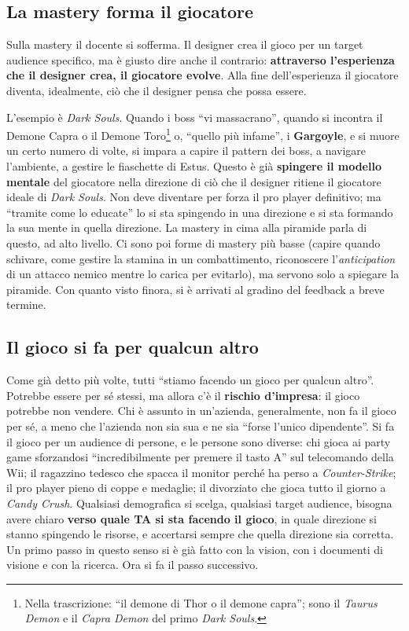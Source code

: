 \subsection{La mastery forma il giocatore}

Sulla mastery il docente si sofferma. Il designer crea il gioco per un target
audience specifico, ma è giusto dire anche il contrario: \textbf{attraverso
l'esperienza che il designer crea, il giocatore evolve}. Alla fine dell'esperienza
il giocatore diventa, idealmente, ciò che il designer pensa che possa essere.

L'esempio è \emph{Dark Souls}. Quando i boss ``vi massacrano'', quando si incontra
il Demone Capra o il Demone Toro\footnote{Nella trascrizione: ``il demone di Thor o il
demone capra''; sono il \emph{Taurus Demon} e il \emph{Capra Demon} del primo
\emph{Dark Souls}.} o, ``quello più infame'', i \textbf{Gargoyle}, e si muore un
certo numero di volte, si impara a capire il pattern dei boss, a navigare
l'ambiente, a gestire le fiaschette di Estus. Questo è già \textbf{spingere il
modello mentale} del giocatore nella direzione di ciò che il designer ritiene il
giocatore ideale di \emph{Dark Souls}. Non deve diventare per forza il pro player
definitivo; ma ``tramite come lo educate'' lo si sta spingendo in una direzione e si
sta formando la sua mente in quella direzione. La mastery in cima alla piramide
parla di questo, ad alto livello. Ci sono poi forme di mastery più basse (capire
quando schivare, come gestire la stamina in un combattimento, riconoscere
l'\emph{anticipation} di un attacco nemico mentre lo carica per evitarlo), ma
servono solo a spiegare la piramide. Con quanto visto finora, si è arrivati al
gradino del feedback a breve termine.

\subsection{Il gioco si fa per qualcun altro}

Come già detto più volte, tutti ``stiamo facendo un gioco per qualcun altro''.
Potrebbe essere per sé stessi, ma allora c'è il \textbf{rischio d'impresa}: il gioco
potrebbe non vendere. Chi è assunto in un'azienda, generalmente, non fa il gioco per
sé, a meno che l'azienda non sia sua e ne sia ``forse l'unico dipendente''. Si fa il
gioco per un audience di persone, e le persone sono diverse: chi gioca ai party
game sforzandosi ``incredibilmente per premere il tasto A'' sul telecomando della
Wii; il ragazzino tedesco che spacca il monitor perché ha perso a
\emph{Counter-Strike}; il pro player pieno di coppe e medaglie; il divorziato che
gioca tutto il giorno a \emph{Candy Crush}. Qualsiasi demografica si scelga,
qualsiasi target audience, bisogna avere chiaro \textbf{verso quale TA si sta
facendo il gioco}, in quale direzione si stanno spingendo le risorse, e accertarsi
sempre che quella direzione sia corretta. Un primo passo in questo senso si è già
fatto con la vision, con i documenti di visione e con la ricerca. Ora si fa il passo
successivo.

